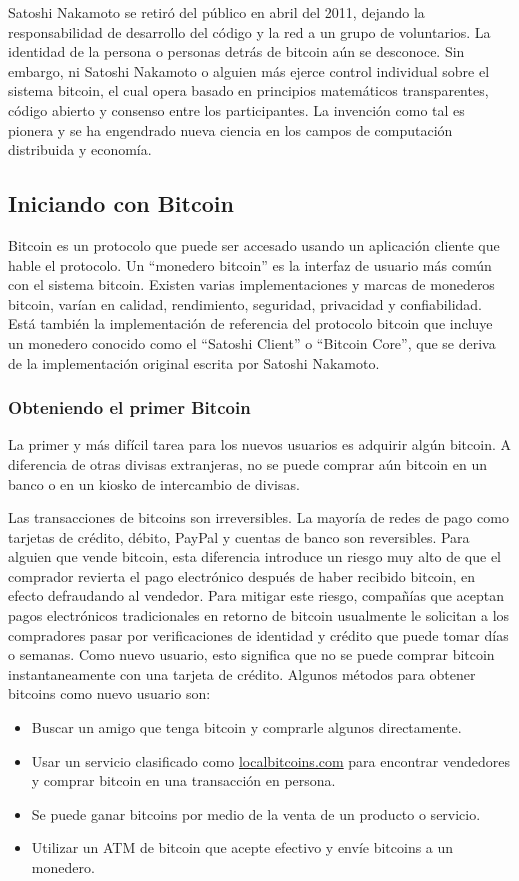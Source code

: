 \documentclass[10pt,journal,compsoc]{IEEEtran}
\begin{document}
Satoshi Nakamoto se retiró del público en abril del 2011, dejando la responsabilidad de desarrollo del código y la red a un grupo de voluntarios. La identidad de la persona o personas detrás de bitcoin aún se desconoce. Sin embargo, ni Satoshi Nakamoto o alguien más ejerce control individual sobre el sistema bitcoin, el cual opera basado en principios matemáticos transparentes, código abierto y consenso entre los participantes. La invención como tal es pionera y se ha engendrado nueva ciencia en los campos de computación distribuida y economía. 

\subsection{Iniciando con Bitcoin}
Bitcoin es un protocolo que puede ser accesado usando un aplicación cliente que hable el protocolo. Un ``monedero bitcoin'' es la interfaz de usuario más común con el sistema bitcoin. Existen varias implementaciones y marcas de monederos bitcoin, varían en calidad, rendimiento, seguridad, privacidad y confiabilidad. Está también la implementación de referencia del protocolo bitcoin que incluye un monedero conocido como el ``Satoshi Client'' o ``Bitcoin Core'', que se deriva de la implementación original escrita por Satoshi Nakamoto.

\subsubsection{Obteniendo el primer Bitcoin}
La primer y más difícil tarea para los nuevos usuarios es adquirir algún bitcoin. A diferencia de otras divisas extranjeras, no se puede comprar aún bitcoin en un banco o en un kiosko de intercambio de divisas.

Las transacciones de bitcoins son irreversibles. La mayoría de redes de pago como tarjetas de crédito, débito, PayPal y cuentas de banco son reversibles. Para alguien que vende bitcoin, esta diferencia introduce un riesgo muy alto de que el comprador revierta el pago electrónico después de haber recibido bitcoin, en efecto defraudando al vendedor. Para mitigar este riesgo, compañías que aceptan pagos electrónicos tradicionales en retorno de bitcoin usualmente le solicitan a los compradores pasar por verificaciones de identidad y crédito que puede tomar días o semanas. Como nuevo usuario, esto significa que no se puede comprar bitcoin instantaneamente con una tarjeta de crédito. Algunos métodos para obtener bitcoins como nuevo usuario son:
\begin{itemize}
    \item Buscar un amigo que tenga bitcoin y comprarle algunos directamente.
    \item Usar un servicio clasificado como \url{localbitcoins.com} para encontrar vendedores y comprar bitcoin en una transacción en persona.
    \item Se puede ganar bitcoins por medio de la venta de un producto o servicio.
    \item Utilizar un ATM de bitcoin que acepte efectivo y envíe bitcoins a un monedero. 
\end{itemize}
\end{document}
